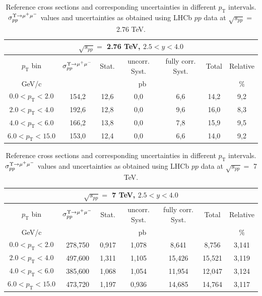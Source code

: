 \begin{table}[htp]
\begin{center}
\begin{tabular}{|c||c|c|c|c|c|c|}
  \hline
  \multicolumn{7}{|c|}{$\sqrt{s_{pp}}=$ 2.76 TeV, $2.5<y<4.0$}\\
  \hline
  $p_\mathrm{T}$ bin & $\sigma_{pp}^{\Upsilon\rightarrow \mu^{+}\mu^{\--}} $ & Stat. & uncorr. Syst. & fully corr. Syst. & Total & Relative \\
  \hline
  GeV/c & \multicolumn{5}{c|}{pb} & $\%$ \\
  \hline
  $0.0 < p_\mathrm{T} < 2.0 $ & 154,2 & 12,6 & 0,0 & 6,6 & 14,2 & 9,2 \\
  \hline
  $2.0 < p_\mathrm{T} < 4.0 $& 192,6 & 12,8 & 0,0	 & 9,6 & 16,0 & 8,3\\
  \hline
  $4.0 < p_\mathrm{T} < 6.0 $& 166,2 & 13,8 & 0,0	 & 7,8 & 15,9 & 9,5\\
  \hline
  $6.0 < p_\mathrm{T} < 15.0 $& 153,0 & 12,4	 & 0,0 & 6,6 & 14,0 & 9,2\\
  \hline
\end{tabular}
\caption{Reference cross sections and corresponding uncertainties in different $p_\mathrm{T}$ intervals. $\sigma_{pp}^{\Upsilon\rightarrow \mu^{+}\mu^{\--}} $ values and uncertainties as obtained using LHCb $pp$ data at $\sqrt{s_{pp}}=$ 2.76 TeV.}\label{table:LHCbData276}
\end{center}
\end{table}

\begin{table}[htp]
\begin{center}
\begin{tabular}{|c||c|c|c|c|c|c|}
  \hline
  \multicolumn{7}{|c|}{$\sqrt{s_{pp}}=$ 7 TeV, $2.5<y<4.0$}\\
  \hline
  $p_\mathrm{T}$ bin & $\sigma_{pp}^{\Upsilon\rightarrow \mu^{+}\mu^{\--}} $ & Stat. & uncorr. Syst. & fully corr. Syst. & Total & Relative \\
  \hline
  GeV/c & \multicolumn{5}{c|}{pb} & $\%$ \\
  \hline
  $0.0 < p_\mathrm{T} < 2.0 $ & 278,750 & 0,917 & 1,078 & 8,641 & 8,756 & 3,141 \\
  \hline
  $2.0 < p_\mathrm{T} < 4.0 $& 497,600 & 1,311 & 1,105 & 15,426 & 15,521 & 3,119 \\
  \hline
  $4.0 < p_\mathrm{T} < 6.0 $& 385,600 & 1,068 & 1,054 & 11,954 & 12,047 & 3,124 \\
  \hline
  $6.0 < p_\mathrm{T} < 15.0 $& 473,720 & 1,197 & 0,936 & 14,685 & 14,764 & 3,117 \\
  \hline
\end{tabular}
\caption{Reference cross sections and corresponding uncertainties in different $p_\mathrm{T}$ intervals. $\sigma_{pp}^{\Upsilon\rightarrow \mu^{+}\mu^{\--}} $ values and uncertainties as obtained using LHCb $pp$ data at $\sqrt{s_{pp}}=$ 7 TeV.}\label{table:LHCbData7}
\end{center}
\end{table}

